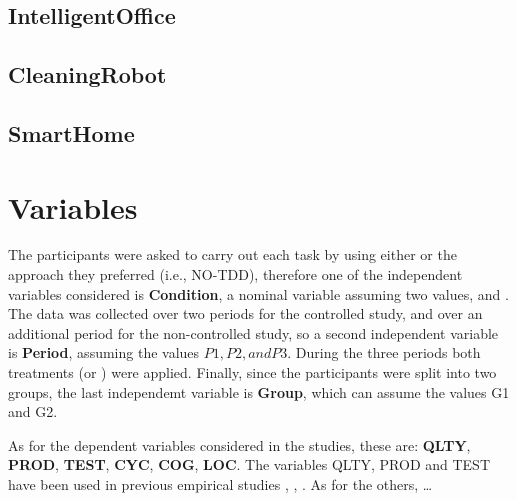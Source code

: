 \subsection{IntelligentOffice}

\subsection{CleaningRobot}

\subsection{SmartHome}




\section{Variables}
The participants were asked to carry out each task by using either \tdd or the approach they preferred (i.e., NO-TDD), therefore one of the independent variables considered is \textbf{Condition}, a nominal variable assuming two values, \tdd and \notdd. The data was collected over two periods for the controlled study, and over an additional period for the non-controlled study, so a second independent variable is \textbf{Period}, assuming the values $P1, P2, and P3$. During the three periods both treatments (\tdd or \notdd) were applied. Finally, since the participants were split into two groups, the last independemt variable is \textbf{Group}, which can assume the values G1 and G2.


As for the dependent variables considered in the studies, these are: \textbf{QLTY}, \textbf{PROD}, \textbf{TEST}, \textbf{CYC}, \textbf{COG}, \textbf{LOC}.
The variables QLTY, PROD and TEST have been used in previous empirical studies \cite{DBLP:journals/tse/ErdogmusMT05}, \cite{DBLP:journals/tse/FucciETOJ17}, \cite{DBLP:journals/ese/TosunDFVTESOTJJ17}. As for the others, \dots

